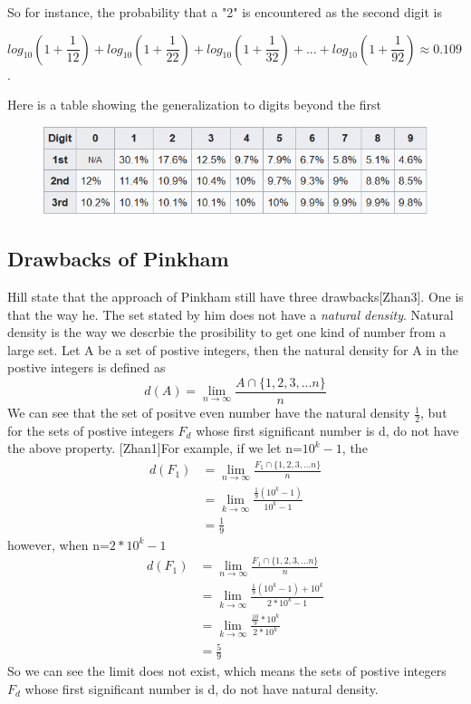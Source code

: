 \documentclass[12pt]{article}
\begin{document}
\par So for instance, the probability that a "2" is encountered as the second digit is\\
\begin{center}
$log_{10}(1+\dfrac{1}{12})+log_{10}(1+\dfrac{1}{22})+log_{10}(1+\dfrac{1}{32})+...+log_{10}(1+\dfrac{1}{92})\approx 0.109$.
\end{center}
Here is a table showing the generalization to digits beyond the first  
\begin{figure}[H]
\centering
\includegraphics[scale=1]{wiki.jpg}
\end{figure}
\subsection{Drawbacks of Pinkham}
Hill state that the approach of Pinkham still have three drawbacks[Zhan3]. One is that the way he.  The set stated by him does not   have a  \emph{natural density}.
Natural density is the way we descrbie the prosibility to get one kind of number from a large set. Let A be a set of postive integers, then the natural density for A in the postive integers is defined as 
$$d(A)=\lim_{n\to \infty}\frac{A\cap\{1,2,3,...n\}}{n}$$
We can see that the set of positve even number have the natural density $\frac12$, but for the sets of postive integers $F_d$ whose first significant number is d, do not have the above property. [Zhan1]For example, if we let n=$10^k-1$, the
\begin{equation*}
\begin{aligned}
d(F_1)&=\lim_{n\to \infty}\frac{F_1\cap\{1,2,3,...n\}}{n}\\
&=\lim_{k\to \infty}\frac{\frac19(10^k-1)}{10^k-1}\\
&=\frac19
\end{aligned}
\end{equation*}
however, when n=$2*10^k-1$
\begin{equation*}
\begin{aligned}
d(F_1)&=\lim_{n\to \infty}\frac{F_1\cap\{1,2,3,...n\}}{n}\\
&=\lim_{k\to \infty}\frac{\frac19(10^k-1)+10^k}{2*10^k-1}\\
&=\lim_{k\to \infty}\frac{\frac{10}9*10^k}{2*10^k}\\
&=\frac59
\end{aligned}
\end{equation*}
So we can see the limit does not exist, which means the sets of postive integers $F_d$ whose first significant number is d, do not have natural density. 
\end{document}
